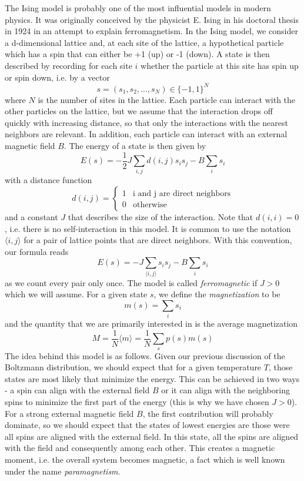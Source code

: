 \documentclass[a4paper, draft]{article}
\theoremstyle{own}
\theoremstyle{remark}
\begin{document}
The Ising model is probably one of the most influential models in modern physics. It was originally conceived by the physicist E. Ising in his doctoral thesis in 1924 in an attempt to explain ferromagnetism. In the Ising model, we consider a d-dimensional lattice and, at each site of the lattice, a hypothetical particle which has a spin that can either be +1 (up) or -1 (down).  A state is then described by recording for each site $i$ whether the particle at this site has spin up or spin down, i.e. by a vector
$$
s = (s_1, s_2 , \dots, s_N ) \in \{ -1, 1\}^N
$$
where $N$ is the number of sites in the lattice. 
Each particle can interact with the other particles on the lattice, but we assume that the interaction drops off quickly with increasing distance, so that only the interactions with the nearest neighbors are relevant. In addition, each particle can interact with an external magnetic field $B$. 
The energy of a state is then given by
$$
E(s) = - \frac{1}{2} J \sum_{i, j} d(i, j) s_i s_j - B \sum_i s_i 
$$
with a distance function
$$
d(i, j) = 
\begin{cases}
1 & \text{i and j are direct neighbors} \\
0 & \text{otherwise}
\end{cases}
$$
and a constant $J$ that describes the size of the interaction. Note that $d(i, i) = 0$, i.e. there is no self-interaction in this model. It is common to use the notation $\langle i, j \rangle$ for a pair of lattice points that are direct neighbors. With this convention, our formula reads
$$
E(s) =  - J \sum_{\langle i, j \rangle }  s_i s_j - B \sum_i s_i 
$$
as we count every pair only once. The model is called {\em ferromagnetic} if $J > 0$ which we will assume. For a given state $s$, we define the {\em magnetization} to be
$$
m(s) = \sum_i s_i
$$
and the quantity that we are primarily interested in is the average magnetization
$$
M = \frac{1}{N} \langle m \rangle = \frac{1}{N}  \sum_s p(s) m(s)
$$
The idea behind this model is as follows. Given our previous discussion of the Boltzmann distribution, we should expect that for a given temperature $T$, those states are most likely that minimize the energy. This can be achieved in two ways - a spin can align with the external field $B$ or it can align with the neighboring spins to minimize the first part of the energy (this is why we have chosen $J > 0$). For a strong external magnetic field $B$, the first contribution will probably dominate, so we should expect that the states of lowest energies are those were all spins are aligned with the external field. In this state, all the spins are aligned with the field and consequently among each other. This creates a magnetic moment, i.e. the overall system becomes magnetic, a fact which is well known under the name {\em paramagnetism}. 
\end{document}
